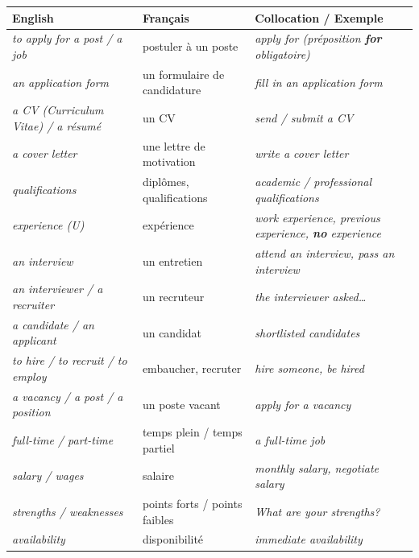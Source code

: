 \documentclass[11pt]{article}
\newcommand{\eng}[1]{\ifmmode\text{\textit{#1}}\else\begingroup\selectlanguage{english}\itshape #1\endgroup\fi}
\begin{document}
\begin{definition}
\begin{center}
\begin{tabularx}{\linewidth}{|X|X|X|}
\hline
\rowcolor{popblueL} \textbf{English} & \textbf{Français} & \textbf{Collocation / Exemple} \\
\hline
\eng{to apply for a post / a job} & postuler à un poste & \eng{apply for} (préposition \textbf{for} obligatoire) \\
\eng{an application form} & un formulaire de candidature & \eng{fill in an application form} \\
\eng{a CV (Curriculum Vitae) / a résumé} & un CV & \eng{send / submit a CV} \\
\eng{a cover letter} & une lettre de motivation & \eng{write a cover letter} \\
\eng{qualifications} & diplômes, qualifications & \eng{academic / professional qualifications} \\
\eng{experience} (U) & expérience & \eng{work experience, previous experience, \textbf{no} experience} \\
\eng{an interview} & un entretien & \eng{attend an interview, pass an interview} \\
\eng{an interviewer / a recruiter} & un recruteur & \eng{the interviewer asked…} \\
\eng{a candidate / an applicant} & un candidat & \eng{shortlisted candidates} \\
\eng{to hire / to recruit / to employ} & embaucher, recruter & \eng{hire someone, be hired} \\
\eng{a vacancy / a post / a position} & un poste vacant & \eng{apply for a vacancy} \\
\eng{full-time / part-time} & temps plein / temps partiel & \eng{a full-time job} \\
\eng{salary / wages} & salaire & \eng{monthly salary, negotiate salary} \\
\eng{strengths / weaknesses} & points forts / points faibles & \eng{What are your strengths?} \\
\eng{availability} & disponibilité & \eng{immediate availability} \\
\hline
\end{tabularx}
\end{center}
\end{definition}
\end{document}

